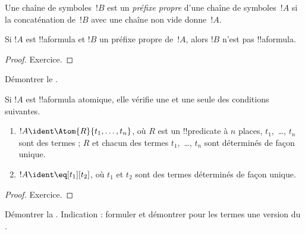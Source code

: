 \documentclass[../../../include/open-logic-section]{subfiles}
\begin{document}
\begin{defn}
Une chaîne de symboles~$!B$ est un \emph{préfixe propre} d'une chaîne
de symboles~$!A$ si la concaténation de~$!B$ avec une chaîne non vide
donne~$!A$.
\end{defn}

\begin{lem}
Si $!A$ est !!a{formula} et $!B$ un préfixe propre de~$!A$, alors
$!B$ n'est pas !!a{formula}.
\end{lem}

\begin{proof}
Exercice.
\end{proof}

\begin{prob}
Démontrer le .
\end{prob}

\begin{prop}
Si $!A$ est !!a{formula} atomique, elle vérifie une et une seule des
conditions suivantes.
\begin{enumerate}
\item $!A \ident \Atom{R}{t_1,\dots,t_n}$, où $R$ est un !!{predicate}
  à $n$ places, $t_1$,~\dots, $t_n$ sont des termes ; $R$ et chacun
  des termes $t_1$,~\dots, $t_n$ sont déterminés de façon unique.
\item $!A \ident \eq[t_1][t_2]$, où $t_1$ et $t_2$ sont des termes
  déterminés de façon unique.
\end{enumerate}
\end{prop}

\begin{proof}
Exercice.
\end{proof}

\begin{prob}
Démontrer la . Indication :
formuler et démontrer pour les termes une version du
.
\end{prob}
\end{document}

